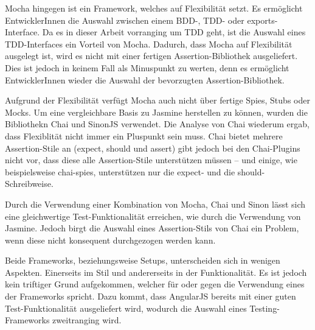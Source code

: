 Mocha hingegen ist ein Framework, welches auf Flexibilität setzt. Es ermöglicht EntwicklerInnen die Auswahl zwischen einem BDD-, TDD- oder exports-Interface. Da es in dieser Arbeit vorranging um TDD geht, ist die Auswahl eines TDD-Interfaces ein Vorteil von Mocha. Dadurch, dass Mocha auf Flexibilität ausgelegt ist, wird es nicht mit einer fertigen Assertion-Bibliothek ausgeliefert. Dies ist jedoch in keinem Fall als Minuspunkt zu werten, denn es ermöglicht EntwicklerInnen wieder die Auswahl der bevorzugten Assertion-Bibliothek.

Aufgrund der Flexibilität verfügt Mocha auch nicht über fertige Spies, Stubs oder Mocks. Um eine vergleichbare Basis zu Jasmine herstellen zu können, wurden die Bibliothekn Chai und SinonJS verwendet. Die Analyse von Chai wiederum ergab, dass Flexiblität nicht immer ein Pluspunkt sein muss. Chai bietet mehrere Assertion-Stile an (expect, should und assert) gibt jedoch bei den Chai-Plugins nicht vor, dass diese alle Assertion-Stile unterstützen müssen -- und einige, wie beispielsweise chai-spies, unterstützen nur die expect- und die should-Schreibweise.

Durch die Verwendung einer Kombination von Mocha, Chai und Sinon lässt sich eine gleichwertige Test-Funktionalität erreichen, wie durch die Verwendung von Jasmine. Jedoch birgt die Auswahl eines Assertion-Stils von Chai ein Problem, wenn diese nicht konsequent durchgezogen werden kann.

Beide Frameworks, beziehungsweise Setups, unterscheiden sich in wenigen Aspekten. Einerseits im Stil und andererseits in der Funktionalität. Es ist jedoch kein triftiger Grund aufgekommen, welcher für oder gegen die Verwendung eines der Frameworks spricht. Dazu kommt, dass AngularJS bereits mit einer guten Test-Funktionalität ausgeliefert wird, wodurch die Auswahl eines Testing-Frameworks zweitranging wird.


